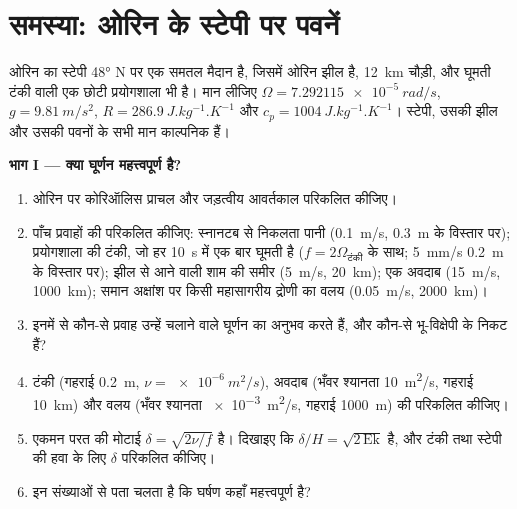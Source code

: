 \section{समस्या: ओरिन के स्टेपी पर पवनें}

\begin{problem}
\label{pb:b3:gfd-foundations:1}
ओरिन का स्टेपी \ang{48} N पर एक समतल मैदान है, जिसमें ओरिन झील है,
\qty{12}{km} चौड़ी, और घूमती टंकी वाली एक छोटी प्रयोगशाला भी है। मान लीजिए
$\Omega = \qty{7.292115e-5}{rad/s}$, $g = \qty{9.81}{m/s^2}$, $R =
\qty{286.9}{J.kg^{-1}.K^{-1}}$ और $c_p = \qty{1004}{J.kg^{-1}.K^{-1}}$।
स्टेपी, उसकी झील और उसकी पवनों के सभी मान काल्पनिक हैं।

\medskip\noindent\textbf{भाग I --- क्या घूर्णन महत्त्वपूर्ण है?}
\begin{enumerate}
\item ओरिन पर कोरिऑलिस प्राचल और जड़त्वीय आवर्तकाल परिकलित कीजिए।
\item पाँच प्रवाहों की  परिकलित कीजिए: स्नानटब से निकलता पानी
  (\qty{0.1}{m/s}, \qty{0.3}{m} के विस्तार पर); प्रयोगशाला की टंकी, जो
  हर \qty{10}{s} में एक बार घूमती है ($f = 2\Omega_{\text{टंकी}}$ के साथ; \qty{5}{mm/s}
  \qty{0.2}{m} के विस्तार पर); झील से आने वाली शाम की समीर (\qty{5}{m/s},
  \qty{20}{km}); एक अवदाब (\qty{15}{m/s}, \qty{1000}{km}); समान अक्षांश पर किसी महासागरीय द्रोणी का वलय
  (\qty{0.05}{m/s}, \qty{2000}{km})।
\item इनमें से कौन-से प्रवाह उन्हें चलाने वाले घूर्णन का अनुभव करते हैं, और कौन-से
  भू-विक्षेपी के निकट हैं?
\item टंकी (गहराई \qty{0.2}{m}, $\nu =
  \qty{e-6}{m^2/s}$), अवदाब (भँवर श्यानता \qty{10}{m^2/s},
  गहराई \qty{10}{km}) और वलय (भँवर श्यानता \qty{e-3}{m^2/s},
  गहराई \qty{1000}{m}) की  परिकलित कीजिए।
\item एकमन परत की मोटाई $\delta = \sqrt{2\nu/f}$ है। दिखाइए कि
  $\delta/H = \sqrt{2\,\mathrm{Ek}}$ है, और टंकी तथा
  स्टेपी की हवा के लिए $\delta$ परिकलित कीजिए।
\item इन संख्याओं से पता चलता है कि घर्षण कहाँ महत्त्वपूर्ण है?
\end{enumerate}


\end{problem}
